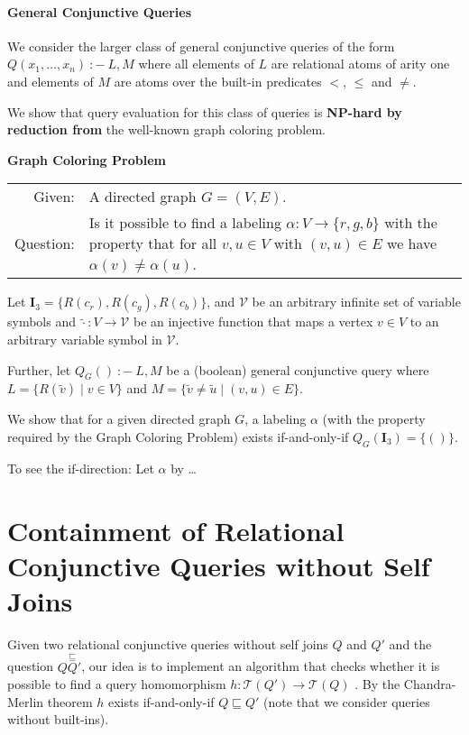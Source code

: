 \documentclass[a4paper,12pt]{article}
\newcommand{\query}[3]{\ensuremath{{#1}({#2})\:{:}{-}\:{#3}}}
\begin{document}
\paragraph{General Conjunctive Queries}{We consider the larger class of general conjunctive queries of the form $\query{Q}{x_1, \dots, x_n}{L,M}$ where all elements of $L$ are relational atoms of arity one and elements of $M$ are atoms over the built-in predicates $<$, $\leq$ and $\not =$.

We show that query evaluation for this class of queries is \textbf{NP-hard by reduction from} the well-known graph coloring problem.

\begin{center}
\textbf{Graph Coloring Problem}\\[1mm]
\begin{tabular}{rp{14cm}}
Given: & A directed graph $G = (V, E)$. \\
Question: & Is it possible to find a labeling $\alpha : V \rightarrow \{r, g, b\}$ with the property that for all $v, u \in V$ with $(v, u) \in E$ we have $\alpha(v) \not = \alpha(u)$.
\end{tabular}
\end{center}

Let $\mathbf{I}_{3} = \{ R(c_r), R(c_g), R(c_b) \}$, and $\mathcal{V}$ be an arbitrary infinite set of variable symbols and $\tilde{\cdot} : V \rightarrow \mathcal{V}$ be an injective function that maps a vertex $v \in V$ to an arbitrary variable symbol in $\mathcal{V}$.

Further, let $\query{Q_G}{}{L,M}$ be a (boolean) general conjunctive query where $L = \{ R(\tilde{v}) \mid v \in V \}$ and $M = \{ \tilde{v} \not = \tilde{u} \mid (v, u) \in E\}$.

We show that for a given directed graph $G$, a labeling $\alpha$ (with the property required by the Graph Coloring Problem) exists if-and-only-if $Q_G(\mathbf{I}_3)
 = \{ () \}$.

To see the if-direction: Let $\alpha$ by \dots

\section{Containment of Relational Conjunctive Queries without Self Joins}

Given two relational conjunctive queries without self joins $Q$ and $Q'$ and the question $Q \stackrel{\sqsubseteq} Q'$, our idea is to implement an algorithm that checks whether it is possible to find a query homomorphism $h : \mathcal{T}(Q') \rightarrow \mathcal{T}(Q)$ . By the Chandra-Merlin theorem $h$ exists if-and-only-if $Q \sqsubseteq Q'$ (note that we consider queries without built-ins).

}
\end{document}
